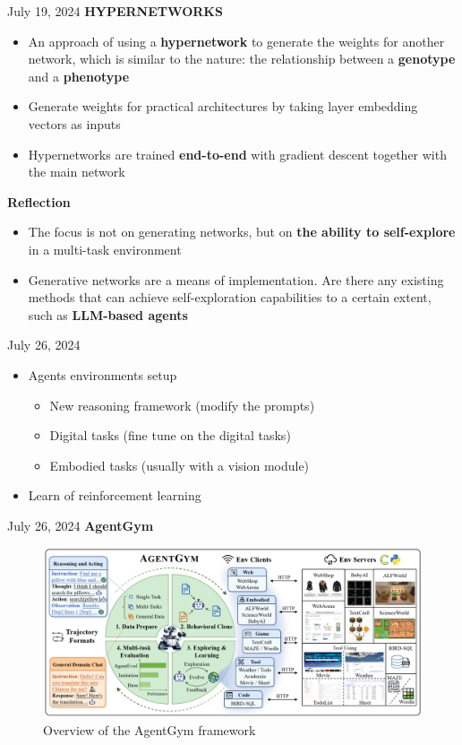 \documentclass[10pt]{beamer}
\begin{document}
\begin{frame}{July 19, 2024}
    \textbf{HYPERNETWORKS}
    \begin{itemize}
        \item An approach of using a \textbf{hypernetwork} to generate the weights for another network, which is similar to the nature: the relationship between a \textbf{genotype} and a \textbf{phenotype}
        \item Generate weights for practical architectures by taking layer embedding vectors as inputs
        \item Hypernetworks are trained \textbf{end-to-end} with gradient descent together with the main network 
    \end{itemize}
    \textbf{Reflection}
    \begin{itemize}
        \item The focus is not on generating networks, but on \textbf{the ability to self-explore} in a multi-task environment
        \item Generative networks are a means of implementation. Are there any existing methods that can achieve self-exploration capabilities to a certain extent, such as \textbf{LLM-based agents}
    \end{itemize}
\end{frame}

\begin{frame}{July 26, 2024}
    \begin{itemize}
        \item Agents environments setup
        \begin{itemize}
            \item New reasoning framework (modify the prompts)
            \item Digital tasks (fine tune on the digital tasks)
            \item Embodied tasks (usually with a vision module)
        \end{itemize}
        \item Learn of reinforcement learning
    \end{itemize}
\end{frame}{}

\begin{frame}{July 26, 2024}
    \textbf{AgentGym}
    \begin{figure}
        \centering
        \includegraphics[width=\textwidth]{Fig/2024.7.26_3.png}
        \caption{Overview of the AgentGym framework}
        \label{fig:my_label}
    \end{figure}
\end{frame}
\end{document}
